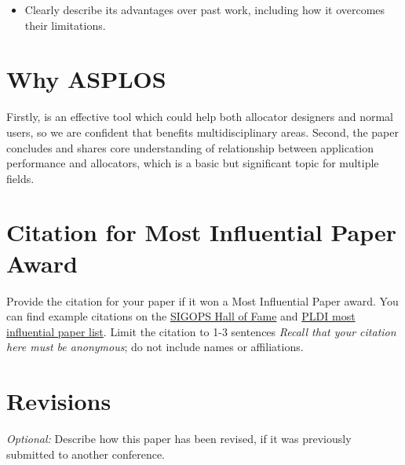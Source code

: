 \documentclass[pageno]{jpaper}
\begin{document}
\begin{itemize}
  \item Clearly describe its advantages over past work, including how it overcomes their limitations.
\end{itemize}


\section{Why ASPLOS}
\label{sec:why-asplos}

Firstly, \MP{} is an effective tool which could help both allocator designers and normal users, so we are confident that \MP{} benefits multidisciplinary areas. Second, the paper concludes and shares core understanding of relationship between application performance and allocators, which is a basic but significant topic for multiple fields.


\section{Citation for Most Influential Paper Award}
\label{sec:citation}

Provide the citation for your paper if it won a Most Influential
Paper award. You can find example citations
on the \href{https://www.sigops.org/awards/hof/}{SIGOPS Hall of Fame}
and \href{https://www.sigplan.org/Awards/PLDI/}{PLDI most influential
  paper list}.  Limit the citation to 1-3 sentences
\emph{Recall that your citation here must be anonymous}; do not include names or affiliations.


\section{Revisions}
\label{sec:revisions}

 \emph{Optional:} Describe how this paper has been revised, if it was previously submitted to another conference.

 
\pagebreak


\end{document}

